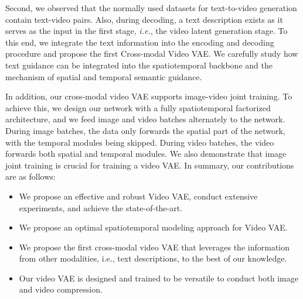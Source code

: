 Second, we observed that the normally used datasets for text-to-video generation contain text-video pairs. 
Also, during decoding, a text description exists as it serves as the input in the first stage, \textit{i.e.}, the video latent generation stage.
%
To this end, we integrate the text information into the encoding and decoding procedure and propose the first Cross-modal Video VAE.
%
We carefully study how text guidance can be integrated into the spatiotemporal backbone and the mechanism of spatial and temporal semantic guidance. 

In addition, our cross-modal video VAE supports image-video joint training.
To achieve this, we design our network with a fully spatiotemporal factorized architecture, and we feed image and video batches alternately to the network. 
%
During image batches, the data only forwards the spatial part of the network, with the temporal modules being skipped. During video batches, the video forwards both spatial and temporal modules. We also demonstrate that image joint training is crucial for training a video VAE.
%
In summary, our contributions are as follows:
\begin{itemize}
    \item We propose an effective and robust Video VAE, conduct extensive experiments, and achieve the state-of-the-art.
    \item We propose an optimal spatiotemporal modeling approach for Video VAE.
    \item We propose the first cross-modal video VAE that leverages the information from other modalities, i.e., text descriptions, to the best of our knowledge.
    \item Our video VAE is designed and trained to be versatile to conduct both image and video compression. 
\end{itemize}

